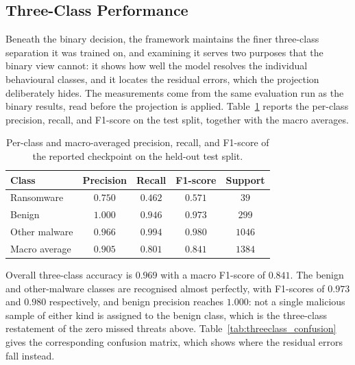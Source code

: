 \documentclass[%
    BCOR=10mm,
    DIV=13,
    toc=bibliography,
    toc=listof,
    oneside,
    12pt,
]{scrbook}
\begin{document}
\subsection{Three-Class Performance}
\label{subsec:threeclass_perf}

Beneath the binary decision, the framework maintains the finer three-class
separation it was trained on, and examining it serves two purposes that the
binary view cannot: it shows how well the model resolves the individual
behavioural classes, and it locates the residual errors, which the projection
deliberately hides. The measurements come from the same evaluation run as the
binary results, read before the projection is applied.
Table~\ref{tab:threeclass_metrics} reports the per-class precision, recall, and
F1-score on the test split, together with the macro averages.

\begin{table}[H]
\centering
\small
\caption[Per-class and macro-averaged test metrics]{Per-class and macro-averaged precision, recall, and F1-score of the
reported checkpoint on the held-out test split.}
\label{tab:threeclass_metrics}
\begin{tabular}{l ccc c}
\toprule
\textbf{Class} & \textbf{Precision} & \textbf{Recall} & \textbf{F1-score} & \textbf{Support} \\
\midrule
Ransomware     & $0.750$ & $0.462$ & $0.571$ & $39$   \\
Benign         & $1.000$ & $0.946$ & $0.973$ & $299$  \\
Other malware  & $0.966$ & $0.994$ & $0.980$ & $1046$ \\
\midrule
Macro average  & $0.905$ & $0.801$ & $0.841$ & $1384$ \\
\bottomrule
\end{tabular}
\end{table}

Overall three-class accuracy is $0.969$ with a macro F1-score of $0.841$. The
benign and other-malware classes are recognised almost perfectly, with
F1-scores of $0.973$ and $0.980$ respectively, and benign precision reaches
$1.000$: not a single malicious sample of either kind is assigned to the benign
class, which is the three-class restatement of the zero missed threats above.
Table~\ref{tab:threeclass_confusion} gives the corresponding confusion matrix,
which shows where the residual errors fall instead.
\end{document}
